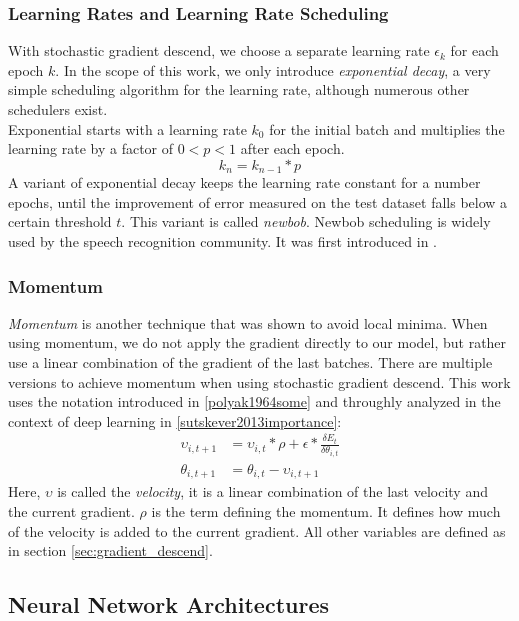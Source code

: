 \subsubsection{Learning Rates and Learning Rate Scheduling}

With stochastic gradient descend, we choose a separate learning rate $\epsilon_k$ for each epoch $k$. In the scope of this work, we only introduce \textit{exponential decay}, a very simple scheduling algorithm for the learning rate, although numerous other schedulers exist. \\
Exponential starts with a learning rate $k_0$ for the initial batch and multiplies the learning rate by a factor of $0 < p < 1$ after each epoch. 
\[
k_n = k_{n - 1} * p
\]
A variant of exponential decay keeps the learning rate constant for a number epochs, until the improvement of error measured on the test dataset falls below a certain threshold $t$. This variant is called \textit{newbob}. Newbob scheduling is widely used by the speech recognition community. It was first introduced in \cite{berkely2000newbob}.

\subsubsection{Momentum}

\textit{Momentum} is another technique that was shown to avoid local minima. When using momentum, we do not apply the gradient directly to our model, but rather use a linear combination of the gradient of the last batches. There are multiple versions to achieve momentum when using stochastic gradient descend. This work uses the notation introduced in \ref{polyak1964some} and throughly analyzed in the context of deep learning in \ref{sutskever2013importance}:
\begin{align*}
\upsilon_{i, t+1} &= \upsilon_{i, t} * \rho + \epsilon * \frac{\delta E_{t}}{\delta \theta_{i, t}} \\
\theta_{i, t+1} &= \theta_{i, t} - \upsilon_{i, t+1}
\end{align*}
Here, $\upsilon$ is called the \textit{velocity}, it is a linear combination of the last velocity and the current gradient. $\rho$ is the term defining the momentum. It defines how much of the velocity is added to the current gradient. All other variables are defined as in section \ref{sec:gradient_descend}.

\subsection{Neural Network Architectures}

